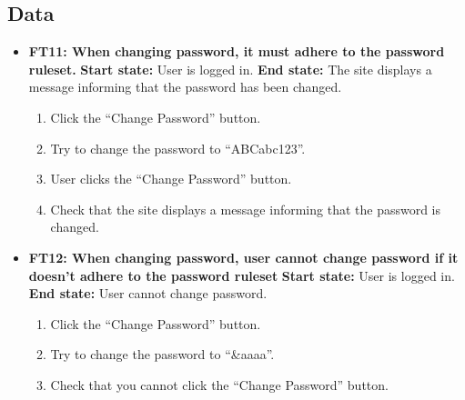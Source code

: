 \documentclass{article}
\begin{document}
\subsection{Data}
\begin{itemize}
		\item \textbf{FT11: When changing password, it must adhere to the password ruleset.} \newline
		\textbf{Start state:} User is logged in. \newline
		\textbf{End state:} The site displays a message informing that the password has been changed.
		\begin{enumerate}
			\item Click the “Change Password” button.
			\item Try to change the password to “ABCabc123”.
			\item User clicks the “Change Password” button.
			\item Check that the site displays a message informing that the password is changed.
		\end{enumerate}
		
			\item \textbf{FT12: When changing password, user cannot change password if it doesn't adhere to the password ruleset} \newline
		\textbf{Start state:} User is logged in. \newline
		\textbf{End state:} User cannot change password.
		\begin{enumerate}
			\item Click the “Change Password” button.
			\item Try to change the password to “\&aaaa”.
			\item Check that you cannot click the “Change Password” button.
		\end{enumerate}
\end{itemize}
\end{document}
